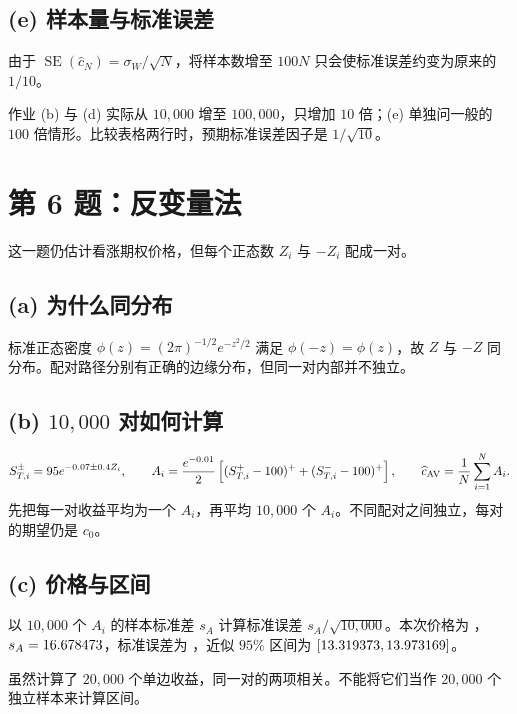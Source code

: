 \documentclass[UTF8,11pt,a4paper,fontset=none]{ctexart}
\newcommand{\SE}{\operatorname{SE}}
\begin{document}
\subsection*{(e) 样本量与标准误差}
由于 $\SE(\widehat c_N)=\sigma_W/\sqrt N$，将样本数增至 $100N$ 只会使标准误差约变为原来的 $1/10$。
\begin{pitfall}
作业 (b) 与 (d) 实际从 $10{,}000$ 增至 $100{,}000$，只增加 $10$ 倍；(e) 单独问一般的 $100$ 倍情形。比较表格两行时，预期标准误差因子是 $1/\sqrt{10}$。
\end{pitfall}

\section{第 6 题：反变量法}
这一题仍估计看涨期权价格，但每个正态数 $Z_i$ 与 $-Z_i$ 配成一对。

\subsection*{(a) 为什么同分布}
标准正态密度 $\phi(z)=(2\pi)^{-1/2}e^{-z^2/2}$ 满足 $\phi(-z)=\phi(z)$，故 $Z$ 与 $-Z$ 同分布。配对路径分别有正确的边缘分布，但同一对内部并不独立。

\subsection*{(b) $10{,}000$ 对如何计算}
\[
S_{T,i}^{\pm}=95e^{-0.07\pm0.4Z_i},\qquad
A_i=\frac{e^{-0.01}}2
\left[(S_{T,i}^{+}-100)^++(S_{T,i}^{-}-100)^+\right],
\qquad
\widehat c_{\rm AV}=\frac1N\sum_{i=1}^N A_i.
\]
先把每一对收益平均为一个 $A_i$，再平均 $10{,}000$ 个 $A_i$。不同配对之间独立，每对的期望仍是 $c_0$。

\subsection*{(c) 价格与区间}
以 $10{,}000$ 个 $A_i$ 的样本标准差 $s_A$ 计算标准误差 $s_A/\sqrt{10{,}000}$。本次价格为 \QSixAVMean，$s_A=16.678473$，标准误差为 \QSixAVSE，近似 $95\%$ 区间为 $[13.319373,13.973169]$。
\begin{pitfall}
虽然计算了 $20{,}000$ 个单边收益，同一对的两项相关。不能将它们当作 $20{,}000$ 个独立样本来计算区间。
\end{pitfall}
\end{document}
